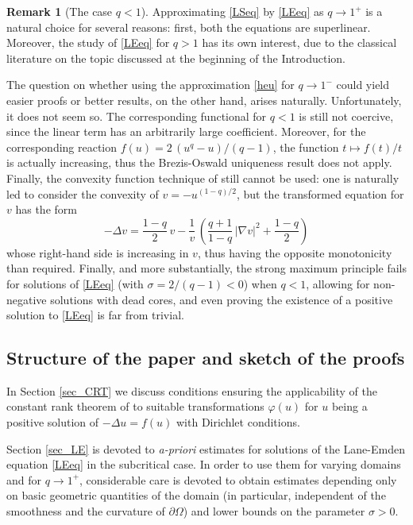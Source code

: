 \documentclass[12pt]{amsart}
\numberwithin{equation}{section}
\theoremstyle{plain}
\theoremstyle{plain}
\theoremstyle{plain}
\theoremstyle{definition}
\newtheorem{remark}[theorem]{Remark}
\begin{document}
 \begin{remark}[The case $q<1$] 
Approximating \eqref{LSeq} by \eqref{LEeq} as $q\to 1^+$ is a natural choice for several reasons: first, both the equations are superlinear. 
Moreover, the study of \eqref{LEeq} for $q>1$ has its own interest, due to the classical literature on the topic discussed at the beginning of the Introduction.
 
The question on whether using the approximation \eqref{heu} for $q\to 1^-$ could yield easier proofs or better results, on the other hand, arises naturally. 
Unfortunately, it does not seem so. 
The corresponding functional for $q<1$ is still not coercive, since the linear term has an arbitrarily large coefficient. 
Moreover, for the corresponding reaction $f(u)=2\, (u^q-u)/(q-1)$, the function $t\mapsto f(t)/t $ is actually increasing, thus the Brezis-Oswald uniqueness \cite{BrOs86} result does not apply. 
Finally, the convexity function technique of \cite{Kor83, Ken85} still cannot be used: one is naturally led to consider the convexity of $v=-u^{(1-q)/2}$, but the transformed equation for $v$ has the form
 $$-\Delta v = \frac{1-q}{2}\, v -\frac{1}{v}\, \left(\frac{q+1}{1-q}\, |\nabla v|^2 + \frac{1-q}{2}\right)$$
whose right-hand side is increasing in $v$, thus having the opposite monotonicity than required. 
Finally, and more substantially, the strong maximum principle fails for solutions of \eqref{LEeq} (with $\sigma=2/(q-1)<0$) when $q<1$, allowing for non-negative solutions with dead cores, and even proving the existence of a positive solution to \eqref{LEeq} is far from trivial.
 \end{remark}
 

\subsection{Structure of the paper and sketch of the proofs}
 
In Section \ref{sec_CRT} we discuss conditions ensuring the applicability of the constant rank theorem of \cite{KoLe87} to suitable transformations $\varphi(u)$ for $u$ being a positive solution of $-\Delta u=f(u)$ with Dirichlet conditions. 

\smallskip

Section \ref{sec_LE} is devoted to {\em a-priori} estimates for solutions of the Lane-Emden equation \eqref{LEeq} in the subcritical case. 
In order to use them for varying domains and for $q\to 1^+$, considerable care is devoted to obtain estimates depending only on basic geometric quantities of the domain (in particular, independent of the smoothness and the curvature of $\partial\Omega$) and lower bounds on the parameter $\sigma>0$.
\end{document}
